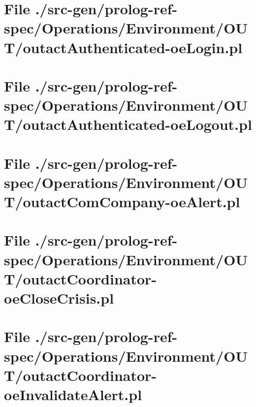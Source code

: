 \section[File /src-gen/prolog-ref-spec/Operations.../outactAuthenticated-oeLogin.pl]{File ./src-gen/prolog-ref-spec/Operations/Environment/OUT/outactAuthenticated-oeLogin.pl}
\scriptsize

\normalsize
	
\section[File /src-gen/prolog-ref-spec/Operations.../outactAuthenticated-oeLogout.pl]{File ./src-gen/prolog-ref-spec/Operations/Environment/OUT/outactAuthenticated-oeLogout.pl}
\scriptsize

\normalsize
	
\section[File /src-gen/prolog-ref-spec/Operations.../outactComCompany-oeAlert.pl]{File ./src-gen/prolog-ref-spec/Operations/Environment/OUT/outactComCompany-oeAlert.pl}
\scriptsize

\normalsize
	
\section[File /src-gen/prolog-ref-spec/Operations.../outactCoordinator-oeCloseCrisis.pl]{File ./src-gen/prolog-ref-spec/Operations/Environment/OUT/outactCoordinator-oeCloseCrisis.pl}
\scriptsize

\normalsize
	
\section[File /src-gen/prolog-ref-spec.../outactCoordinator-oeInvalidateAlert.pl]{File ./src-gen/prolog-ref-spec/Operations/Environment/OUT/outactCoordinator-oeInvalidateAlert.pl}
\scriptsize

\normalsize
	
